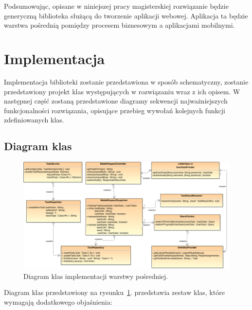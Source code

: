 Podsumowując, opisane w niniejszej pracy magisterskiej rozwiązanie będzie generyczną biblioteka służącą do tworzenie aplikacji webowej. Aplikacja ta będzie warstwa pośrednią pomiędzy procesem biznesowym a aplikacjami mobilnymi. 


\section{Implementacja}
\label{sec:impl}

Implementacja biblioteki zostanie przedstawiona w sposób schematyczny, zostanie przedstawiony projekt klas występujących w rozwiązaniu wraz z ich opisem. W następnej część zostaną przedstawione diagramy sekwencji najważniejszych funkcjonalności rozwiązania, opisujące przebieg wywołań kolejnych funkcji zdefiniowanych klas. 

\subsection{Diagram klas}

\begin{figure}[h]
\centerline{\includegraphics[scale=0.45]{classDiagram}}
\caption{Diagram klas implementacji warstwy pośredniej.}
\label{fig:classDiagram}
\end{figure}

Diagram klas przedstawiony na rysunku~\ref{fig:classDiagram}. przedstawia zestaw klas, które wymagają dodatkowego objaśnienia: 


